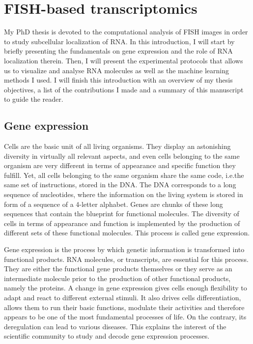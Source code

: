 
\graphicspath{{./figures/introduction/}}

\chapter{FISH-based transcriptomics}
\label{ch:introduction}

\minitoc
\newpage

My PhD thesis is devoted to the computational analysis of \ac{FISH} images in order to study subcellular localization of \ac{RNA}.
In this introduction, I will start by briefly presenting the fundamentals on gene expression and the role of \ac{RNA} localization therein.
Then, I will present the experimental protocols that allows us to visualize and analyse \ac{RNA} molecules as well as the machine learning methods I used.
I will finish this introduction with an overview of my thesis objectives, a list of the contributions I made and a summary of this manuscript to guide the reader.

\section{Gene expression}
\label{sec:gene_expression}

Cells are the basic unit of all living organisms.
They display an astonishing diversity in virtually all relevant aspects, and even cells belonging to the same organism are very different in terms of appearance and specific function they fulfill.
Yet, all cells belonging to the same organism share the same code, i.e.\space the same set of instructions, stored in the \ac{DNA}.
The \ac{DNA} corresponds to a long sequence of nucleotides, where the information on the living system is stored in form of a sequence of a 4-letter alphabet.
Genes are chunks of these long sequences that contain the blueprint for functional molecules.
The diversity of cells in terms of appearance and function is implemented by the production of different sets of these functional molecules.
This process is called gene expression.

Gene expression is the process by which genetic information is transformed into functional products.
\ac{RNA} molecules, or transcripts, are essential for this process.
They are either the functional gene products themselves or they serve as an intermediate molecule prior to the production of other functional products, namely the proteins.
A change in gene expression gives cells enough flexibility to adapt and react to different external stimuli.
It also drives cells differentiation, allows them to run their basic functions, modulate their activities and therefore appears to be one of the most fundamental processes of life.
On the contrary, its deregulation can lead to various diseases.
This explains the interest of the scientific community to study and decode gene expression processes.

